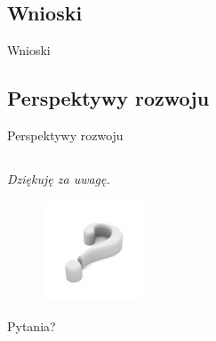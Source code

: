 \documentclass[xcolor=x11names,compress]{beamer}
\renewcommand{\(}{\begin{columns}}
\renewcommand{\)}{\end{columns}}
\newcommand{\<}[1]{\begin{column}{#1}}
\renewcommand{\>}{\end{column}}
\begin{document}
\subsection*{Wnioski}
\begin{frame}{Wnioski}

\end{frame}

\subsection*{Perspektywy rozwoju}
\begin{frame}{Perspektywy rozwoju}

\end{frame}


\subsection*{}
\begin{frame}{}

\it
\Large{Dziękuję za uwagę.}

\begin{figure}[h!]
\centering
\includegraphics[width=3cm]{../Common/img/qmark}
\end{figure}

\hfill\Large{Pytania?}

\end{frame}





\end{document}

